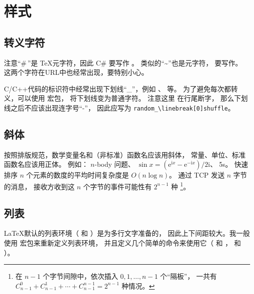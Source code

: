 \chapter{样式}

\section{转义字符}
注意“\#\,”是 \TeX 元字符，因此 C\# 要写作 。
类似的“\textasciitilde”也是元字符，
要写作。
这两个字符在URL中也经常出现，要特别小心。

C/C++代码的标识符中经常出现下划线“_”，例如 、
 等。
为了避免每次都转义，可以使用  宏包，
将下划线变为普通字符。
注意这里  在行尾断字，
那么下划线之后不应该出现连字号“-”，
因此应写为 \verb|random_\linebreak[0]shuffle|。

\section{斜体}
按照排版规范，数学变量名和（非标准）函数名应该用斜体，
常量、单位、标准函数名应该用正体。
例如：%
$n$-body 问题、%
$\sin x = (\mathrm{e}^{\mathrm{i}x} - \mathrm{e}^{-\mathrm{i}x})/2\mathrm{i}$、
5\textmu s。
快速排序 $n$ 个元素的数度的平均时间复杂度是 $O(n \log n)$。
通过 TCP 发送 $n$ 字节的消息，
接收方收到这 $n$ 个字节的事件可能性有 $2^{n-1}$ 种
\footnote{在 $n-1$ 个字节间隙中，依次插入 $0, 1, \ldots, n-1$ 个“隔板”，
一共有 $C_{n-1}^0 + C_{n-1}^1 + \cdots + C_{n-1}^{n-1} = 2 ^ {n-1} $ 种情况。}。

\section{列表}
\LaTeX 默认的列表环境（ 和 ）是为多行文字准备的，
因此上下间距较大。我一般使用  宏包来重新定义列表环境，
并且定义几个简单的命令来使用它（ 和 ， 和 ）。
\begin{Code}
\newcommand\begindot{\begin{itemize}
[itemsep=2pt plus 2pt minus 2pt,%
topsep=3pt plus 2pt minus 2pt,%
parsep=0pt plus 2pt minus 2pt]}
\newcommand\myenddot{\end{itemize}}
\end{Code}


